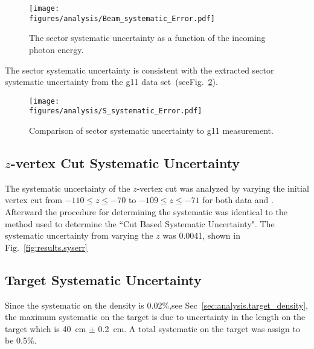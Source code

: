 \begin{figure}[h!]\begin{center}
\texttt{[image: \\figures/analysis/Beam\_systematic\_Error.pdf]}
\caption[The sector systematic uncertainty as a function of the incoming photon energy]{\label{fig:sys_sec_error}The sector systematic uncertainty as a function of the incoming photon energy.}
\end{center}\end{figure}
The sector systematic uncertainty is consistent with the extracted sector systematic uncertainty from the g11 data set~\cite{williams}(seeFig.~\ref{fig:sys_sec_error.compare}).
\begin{figure}[h!]\begin{center}
\texttt{[image: \\figures/analysis/S\_systematic\_Error.pdf]}
\caption[Comparison of sector systematic uncertainty to g11 measurement]{\label{fig:sys_sec_error.compare}Comparison of sector systematic uncertainty to g11 measurement.}
\end{center}\end{figure}
\FloatBarrier

\subsection{$z$-vertex Cut Systematic Uncertainty}
The systematic uncertainty of the $z$-vertex cut was analyzed by varying the initial vertex cut from $-110 \le z \le -70$ to $-109 \le z \le -71$ for both data and . Afterward the procedure for determining the systematic was identical to the method used to determine the ``Cut Based Systematic Uncertainty". The systematic uncertainty from varying the $z$ was 0.0041, shown in Fig.~\ref{fig:results.syserr}

\subsection{Target Systematic Uncertainty}
Since the systematic on the density is 0.02\%,see Sec~\ref{sec:analysis.target_density}, the maximum systematic on the target is due to uncertainty in the length on the target which is 40~cm $\pm$ 0.2~cm. A total systematic on the target was assign to be 0.5\%. 

